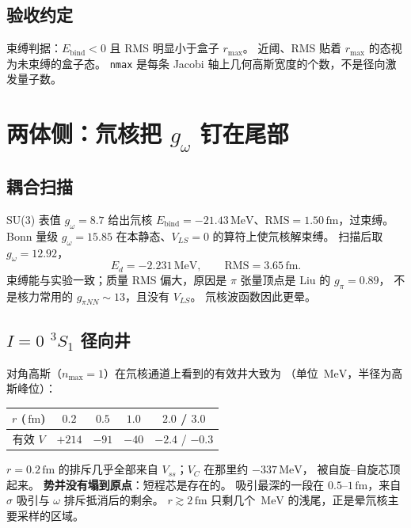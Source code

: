\documentclass[12pt,a4paper]{article}
\newcommand{\MeV}{\,\mathrm{MeV}}
\newcommand{\fm}{\,\mathrm{fm}}
\begin{document}
\subsection{验收约定}

束缚判据：$E_{\mathrm{bind}}<0$ 且 RMS 明显小于盒子 $r_{\max}$。
近阈、RMS 贴着 $r_{\max}$ 的态视为未束缚的盒子态。
\texttt{nmax} 是每条 Jacobi 轴上几何高斯宽度的个数，不是径向激发量子数。

\section{\texorpdfstring{两体侧：氘核把 $g_\omega$ 钉在尾部}{两体侧：氘核把 g\_omega 钉在尾部}}

\subsection{耦合扫描}

SU(3) 表值 $g_\omega=8.7$ 给出氘核 $E_{\mathrm{bind}}=-21.43\MeV$、$\mathrm{RMS}=1.50\fm$，过束缚。
Bonn 量级 $g_\omega=15.85$ 在本静态、$V_{LS}=0$ 的算符上使氘核解束缚。
扫描后取 $g_\omega=12.92$，
\begin{equation}
  E_d=-2.231\MeV,\qquad \mathrm{RMS}=3.65\fm.
\end{equation}
束缚能与实验一致；质量 RMS 偏大，原因是 $\pi$ 张量顶点是 Liu 的 $g_\pi=0.89$，
不是核力常用的 $g_{\pi NN}\sim 13$，且没有 $V_{LS}$。
氘核波函数因此更晕。

\subsection{\texorpdfstring{$I=0$ ${}^3S_1$ 径向井}{I=0 3S1 径向井}}

对角高斯（$n_{\max}=1$）在氘核通道上看到的有效井大致为
（单位 $\MeV$，半径为高斯峰位）：

\begin{center}
\begin{tabular}{@{}ccccc@{}}
\toprule
$r$ ($\fm$) & $0.2$ & $0.5$ & $1.0$ & $2.0$ / $3.0$ \\
\midrule
有效 $V$ & $+214$ & $-91$ & $-40$ & $-2.4$ / $-0.3$ \\
\bottomrule
\end{tabular}
\end{center}

$r=0.2\fm$ 的排斥几乎全部来自 $V_{ss}$；$V_C$ 在那里约 $-337\MeV$，
被自旋--自旋芯顶起来。
\textbf{势并没有塌到原点}：短程芯是存在的。
吸引最深的一段在 $0.5$--$1\fm$，来自 $\sigma$ 吸引与 $\omega$ 排斥抵消后的剩余。
$r\gtrsim 2\fm$ 只剩几个 $\MeV$ 的浅尾，正是晕氘核主要采样的区域。
\end{document}
